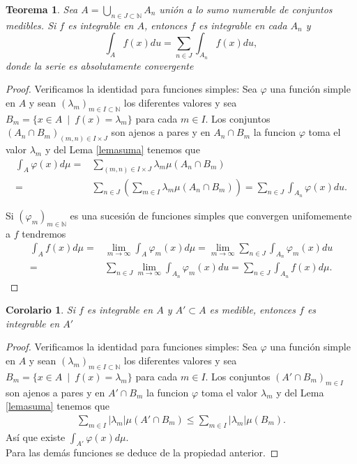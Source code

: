 \documentclass[twoside,12pt,a4 paper,openright]{book}
\newtheorem{teo}[claim]{Teorema}
\newtheorem{cor}[claim]{Corolario}
\begin{document}
\begin{teo}
    Sea $A = \bigcup_{n\in J\subset \mathbb N} A_n$ uni\'on a lo sumo numerable de conjuntos medibles. Si $f$ es integrable en $A$, entonces $f$ es integrable en cada $A_n$ y 
    $$\int_A f(x) du = \sum_{n\in J } \int_{A_n}f(x) du ,$$
    donde la serie es absolutamente convergente
\end{teo}
\begin{proof}
Verificamos la identidad para funciones simples: Sea  $\varphi$ una funci\'on simple en  $A$ y sean $(\lambda_m)_{m\in I\subset \mathbb N} $ los diferentes valores y sea $B_m=\{ x\in A \  \mid \ f(x)=\lambda_ m\}$ para cada $ m \in I $. Los conjuntos $(A_n\cap B_m)_{(m,n)\in I\times J }$ son ajenos a pares y en 
$A_n\cap B_m $ la funcion $\varphi$  toma el valor $\lambda_m$ y del Lema \ref{lemasuma}
 tenemos que  
 \begin{align*}
 \int_{A} \varphi (x) d\mu  = & \sum_{(m,n)\in I\times J } \lambda_m \mu(A_n\cap B_m)  \\
  = &  \sum_{ n \in J }  (   \sum_{ m \in I } \lambda_m \mu(A_n\cap B_m) ) = \sum_{n\in J} \int_{A_n}\varphi(x) du. 
 \end{align*}
 
 Si $(\varphi_m)_{m\in\mathbb N}$ es una sucesi\'on de funciones simples que convergen unifomemente a $f$ tendremos 
  \begin{align*}
  \int_{A} f (x) d\mu   = & \lim_{m\to \infty }
  \int_{A} \varphi_m (x) d\mu     = \lim_{m\to \infty } \sum_{n\in J} \int_{A_n}\varphi_m(x) du \\
  =&  \sum_{n\in J}   \lim_{m\to \infty } \int_{A_n}\varphi_m(x) du  = \sum_{n\in J} \int_{A_n} f (x) d\mu  . 
 \end{align*}
 
  \end{proof}





\begin{cor}
    Si $f$ es integrable en $A$ y $A'\subset A$ es medible, entonces $f$ es integrable en $A'$
\end{cor}
\begin{proof}
Verificamos la identidad para funciones simples: Sea  $\varphi$ una funci\'on simple en  $A$ y sean $(\lambda_m)_{m\in I\subset \mathbb N} $ los diferentes valores y sea $B_m=\{ x\in A \  \mid \ f(x)=\lambda_ m\}$ para cada $ m \in I $. Los conjuntos $(A'\cap B_m)_{m\in I }$ son ajenos a pares y en 
$A'\cap B_m $ la funcion $\varphi$  toma el valor $\lambda_m$ y del Lema \ref{lemasuma}
 tenemos que  
 \begin{align*}
  \sum_{ m \in I  }| \lambda_m |\mu(A'\cap B_m)  \leq     \sum_{ m \in I }| \lambda_m |\mu( B_m)  . 
 \end{align*}
 As\'i que existe $\int_{A'} \varphi(x)d\mu $. 
 \\
 
Para las dem\'as funciones se deduce de la propiedad anterior.

  \end{proof}
\end{document}
